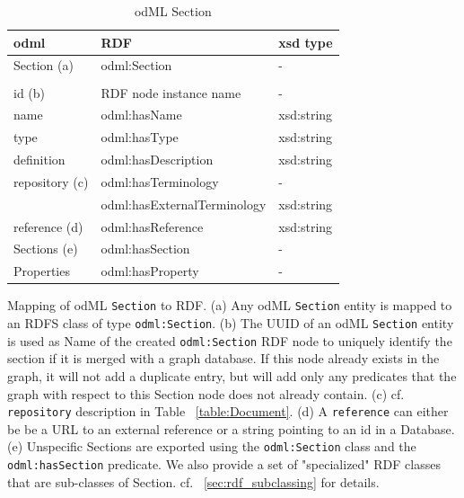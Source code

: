 \documentclass{article}
\begin{document}
\begin{table}
\begin{threeparttable}
\begin{tabular}{p{3.5cm}p{5cm}p{2cm}}
\toprule
    odml            & RDF                             & xsd type \\
\midrule
    Section (a)     & odml:Section                    & - \\
                    & & \\
    id (b)          & RDF node instance name          & - \\
    name            & odml:hasName                    & xsd:string \\
    type            & odml:hasType                    & xsd:string \\
    definition      & odml:hasDescription             & xsd:string \\
    repository (c)  & odml:hasTerminology             & - \\
                    & odml:hasExternalTerminology     & xsd:string \\
    reference (d)   & odml:hasReference               & xsd:string \\
    Sections (e)    & odml:hasSection                 & - \\
    Properties      & odml:hasProperty                & - \\
\bottomrule
\end{tabular}
\caption{odML Section}
\begin{tablenotes}
\item Mapping of odML \texttt{Section} to RDF. (a) Any odML \texttt{Section} entity is mapped to an RDFS class of type \texttt{odml:Section}. (b) The UUID of an odML \texttt{Section} entity is used as Name of the created \texttt{odml:Section} RDF node to uniquely identify the section if it is merged with a graph database. If this node already exists in the graph, it will not add a duplicate entry, but will add only any predicates that the graph with respect to this Section node does not already contain.
(c) cf. \texttt{repository} description in Table ~\ref{table:Document}. (d) A \texttt{reference} can either be be a URL to an external reference or a string pointing to an id in a Database. (e) Unspecific Sections are exported using the \texttt{odml:Section} class and the \texttt{odml:hasSection} predicate. We also provide a set of "specialized" RDF classes that are sub-classes of Section. cf. ~\ref{sec:rdf_subclassing} for details.
\end{tablenotes}
\label{table:Section}
\end{threeparttable}
\end{table}
\end{document}
